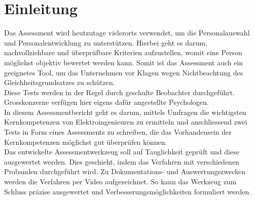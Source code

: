 
\chapter{Einleitung}

Das Assessment wird heutzutage vielerorts verwendet, um die Personalauswahl und Personalentwicklung zu unterstützen. Hierbei geht es darum, nachvollziehbare und überprüfbare Kriterien aufzustellen, womit eine Person möglichst objektiv bewertet werden kann. Somit ist das Assessment auch ein geeignetes Tool, um das Unternehmen vor Klagen wegen Nichtbeachtung des Gleichheitsgrundsatzes zu schützen. \\ 
Diese Tests werden in der Regel durch geschulte Beobachter durchgeführt. Grosskonzerne verfügen hier eigens dafür angestellte Psychologen. \\
In diesem Assessmentbericht geht es darum, mittels Umfragen die wichtigsten Kernkompetenzen von Elektroingenieuren zu ermitteln und anschliessend zwei Tests in Form eines Assessments zu schreiben, die das Vorhandensein der Kernkompetenzen möglichst gut überprüfen können. \\
Das entwickelte Assessmentwerkzeug soll auf Tauglichkeit geprüft und diese ausgewertet werden. Dies geschieht, indem das Verfahren mit verschiedenen Probanden durchgeführt wird. Zu Dokumentations- und Auswertungszwecken werden die Verfahren per Video aufgezeichnet. So kann das Werkzeug zum Schluss präzise ausgewertet und Verbesserungsmöglichkeiten formuliert werden.
  

